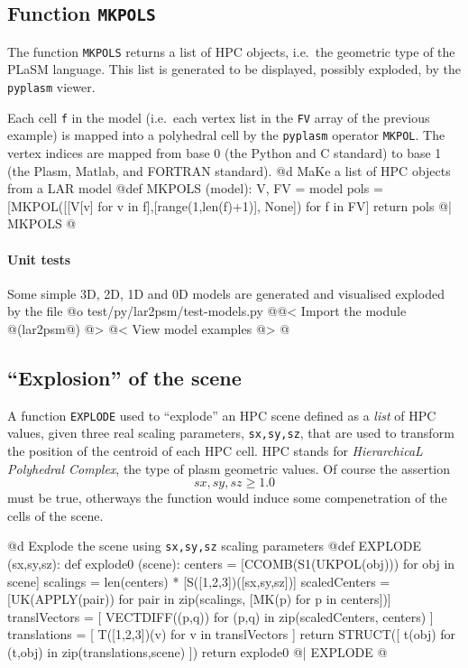 \documentclass[11pt,oneside]{article}	%
\begin{document}
\subsection{Function \texttt{MKPOLS}}

The function \texttt{MKPOLS} returns a list of HPC objects, i.e.~the geometric type of the PLaSM language. This list is generated to be displayed, possibly exploded, by the \texttt{pyplasm} viewer. 

Each cell \texttt{f} in the model (i.e.~each vertex list in the \texttt{FV} array of the previous example) is mapped into a polyhedral cell by the \texttt{pyplasm} operator \texttt{MKPOL}. The vertex indices are mapped from base 0 (the Python and C standard) to base 1 (the Plasm, Matlab, and FORTRAN standard).
@d MaKe a list of HPC objects from a LAR model
@{def MKPOLS (model):
    V, FV = model
    pols = [MKPOL([[V[v] for v in f],[range(1,len(f)+1)], None]) for f in FV]
    return pols  
@| MKPOLS @}

\paragraph{Unit tests}
Some simple 3D, 2D, 1D and 0D models are generated and visualised exploded by the file
@o test/py/lar2psm/test-models.py
@{@< Import the module @(lar2psm@) @>
@< View model examples @>
@}

\subsection{``Explosion'' of the scene}

A function \texttt{EXPLODE} used to ``explode'' an HPC scene defined as a \emph{list} of HPC values, given three real scaling parameters, \texttt{sx,sy,sz}, that are used to transform the position of the centroid of each HPC cell. HPC stands for \emph{HierarchicaL Polyhedral Complex}, the  type of plasm geometric values. Of course the assertion
\[
sx,sy,sz \geq 1.0
\]
must be true, otherways the function would induce some compenetration of the cells of the scene.

@d Explode the scene using \texttt{sx,sy,sz} scaling parameters
@{def EXPLODE (sx,sy,sz):
    def explode0 (scene):
        centers = [CCOMB(S1(UKPOL(obj))) for obj in scene]
        scalings = len(centers) * [S([1,2,3])([sx,sy,sz])]
        scaledCenters = [UK(APPLY(pair)) for pair in
                         zip(scalings, [MK(p) for p in centers])]
        translVectors = [ VECTDIFF((p,q)) for (p,q) in zip(scaledCenters, centers) ]
        translations = [ T([1,2,3])(v) for v in translVectors ]
        return STRUCT([ t(obj) for (t,obj) in zip(translations,scene) ])
    return explode0  
@| EXPLODE @}
\end{document}
